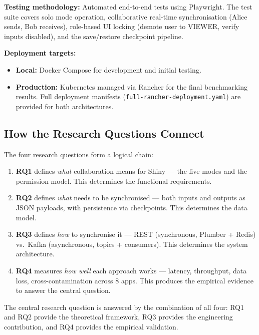 \documentclass[12pt,a4paper]{article}
\begin{document}
\textbf{Testing methodology:} Automated end-to-end tests using Playwright. The test suite covers solo mode operation, collaborative real-time synchronisation (Alice sends, Bob receives), role-based UI locking (demote user to VIEWER, verify inputs disabled), and the save/restore checkpoint pipeline.

\textbf{Deployment targets:}
\begin{itemize}[nosep]
  \item \textbf{Local:} Docker Compose for development and initial testing.
  \item \textbf{Production:} Kubernetes managed via Rancher for the final benchmarking results. Full deployment manifests (\texttt{full-rancher-deployment.yaml}) are provided for both architectures.
\end{itemize}

\subsection{How the Research Questions Connect}

The four research questions form a logical chain:

\begin{enumerate}
  \item \textbf{RQ1} defines \textit{what} collaboration means for Shiny --- the five modes and the permission model. This determines the functional requirements.
  \item \textbf{RQ2} defines \textit{what} needs to be synchronised --- both inputs and outputs as JSON payloads, with persistence via checkpoints. This determines the data model.
  \item \textbf{RQ3} defines \textit{how} to synchronise it --- REST (synchronous, Plumber + Redis) vs.\ Kafka (asynchronous, topics + consumers). This determines the system architecture.
  \item \textbf{RQ4} measures \textit{how well} each approach works --- latency, throughput, data loss, cross-contamination across 8 apps. This produces the empirical evidence to answer the central question.
\end{enumerate}

The central research question is answered by the combination of all four: RQ1 and RQ2 provide the theoretical framework, RQ3 provides the engineering contribution, and RQ4 provides the empirical validation.

\newpage

\end{document}
